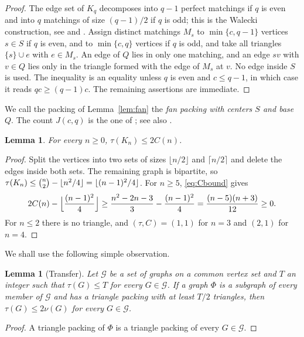 \documentclass{amsart}
\newtheorem{lemma}[theorem]{Lemma}
\theoremstyle{definition}
\numberwithin{equation}{section}
\numberwithin{table}{section}
\newcommand{\binomtwo}[1]{\tbinom{#1}{2}}
\begin{document}
\begin{proof}
The edge set of $K_q$ decomposes into $q-1$ perfect matchings if $q$ is even and into $q$ matchings of size $(q-1)/2$ if $q$ is odd; this is the Walecki construction, see \cite[Lemma~1]{FS12} and \cite[Lemma~3]{BBG22}. Assign distinct matchings $M_s$ to $\min\{c,q-1\}$ vertices $s\in S$ if $q$ is even, and to $\min\{c,q\}$ vertices if $q$ is odd, and take all triangles $\{s\}\cup e$ with $e\in M_s$. An edge of $Q$ lies in only one matching, and an edge $sv$ with $v\in Q$ lies only in the triangle formed with the edge of $M_s$ at $v$. No edge inside $S$ is used. The inequality is an equality unless $q$ is even and $c\le q-1$, in which case it reads $qc\ge(q-1)c$. The remaining assertions are immediate.
\end{proof}

We call the packing of Lemma~\ref{lem:fan} the \emph{fan packing with centers $S$ and base $Q$}. The count $J(c,q)$ is the one of \cite[Proposition~1]{CG23}; see also \cite[Corollary~5]{BBG22}.

\begin{lemma}\label{lem:complete}
For every $n\ge 0$, $\tau(K_n)\le 2C(n)$.
\end{lemma}

\begin{proof}
Split the vertices into two sets of sizes $\lfloor n/2\rfloor$ and $\lceil n/2\rceil$ and delete the edges inside both sets. The remaining graph is bipartite, so $\tau(K_n)\le\binomtwo{n}-\lfloor n^2/4\rfloor=\lfloor (n-1)^2/4\rfloor$. For $n\ge 5$, \eqref{eq:Cbound} gives
\[
2C(n)-\Bigl\lfloor\frac{(n-1)^2}{4}\Bigr\rfloor\ge \frac{n^2-2n-3}{3}-\frac{(n-1)^2}{4}=\frac{(n-5)(n+3)}{12}\ge 0.
\] For $n\le 2$ there is no triangle, and $(\tau,C)=(1,1)$ for $n=3$ and $(2,1)$ for $n=4$.
\end{proof}

We shall use the following simple observation.

\begin{lemma}[Transfer]\label{lem:transfer}
Let $\mathcal G$ be a set of graphs on a common vertex set and $T$ an integer such that $\tau(G)\le T$ for every $G\in\mathcal G$. If a graph $\Phi$ is a subgraph of every member of $\mathcal G$ and has a triangle packing with at least $T/2$ triangles, then $\tau(G)\le 2\nu(G)$ for every $G\in\mathcal G$.
\end{lemma}

\begin{proof}
A triangle packing of $\Phi$ is a triangle packing of every $G\in\mathcal G$.
\end{proof}
\end{document}
